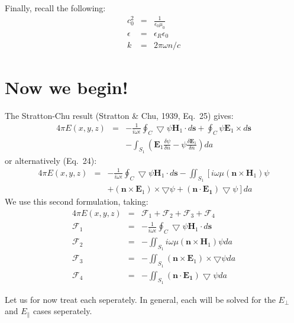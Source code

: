 \documentclass[a4article,12pt]{article}
\begin{document}
Finally, recall the following:
%
\begin{eqnarray}
c^2_0 & = & \frac{1}{\epsilon_0 \mu_0} \\
\epsilon & = & \epsilon_R \epsilon_0 \\
k & = & 2 \pi \omega n/c
\end{eqnarray}


\section{Now we begin!}

The Stratton-Chu result (Stratton \& Chu, 1939, Eq.\ 25) gives:
%
\begin{eqnarray}
4 \pi E \left(x,y,z\right) & = & - \frac{1}{i \omega \epsilon} \oint_C \bigtriangledown \psi \mathbf{H}_1 \cdot d \mathbf{s} + \oint_C \psi \mathbf{E}_1 \times d \mathbf{s}  \nonumber \\
& & - \int_{S_1} \left(\mathbf{E}_1 \frac{\delta \psi}{\delta n} - \psi \frac{\delta \mathbf{E}_1}{\delta n} \right) da
\end{eqnarray}
%
or alternatively (Eq.\ 24):
%
\begin{eqnarray}
4 \pi E \left(x,y,z\right) & = & - \frac{1}{i \omega \epsilon} \oint_C \bigtriangledown \psi \mathbf{H}_1 \cdot d \mathbf{s} -\iint_{S_1} \left[ i \omega \mu (\mathbf{n} \times \mathbf{H}_1) \psi \right. \nonumber \\
& & + \left. (\mathbf{n} \times \mathbf{E}_1) \times \bigtriangledown \psi + (\mathbf{n} \cdot \mathbf{E_1}) \bigtriangledown \psi \right] da
\end{eqnarray}
%
We use this second formulation, taking:
%
\begin{eqnarray}
4 \pi E \left(x,y,z\right) & = & \mathcal{F}_1 + \mathcal{F}_2 + \mathcal{F}_3 + \mathcal{F}_4\\
\mathcal{F}_1 & = & - \frac{1}{i \omega \epsilon} \oint_C \bigtriangledown \psi \mathbf{H}_1 \cdot d \mathbf{s} \\
\mathcal{F}_2 & = & - \iint_{S_1} i \omega \mu (\mathbf{n} \times \mathbf{H}_1) \psi da \\ 
\mathcal{F}_3 & = & - \iint_{S_1} (\mathbf{n} \times \mathbf{E}_1) \times \bigtriangledown \psi da \\
\mathcal{F}_4 & = & - \iint_{S_1} (\mathbf{n} \cdot \mathbf{E_1}) \bigtriangledown \psi da
\end{eqnarray}

Let us for now treat each seperately. In general, each will be solved for the $E_{\perp}$ and $E_{\parallel}$ cases seperately.
\end{document}
